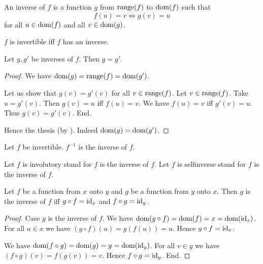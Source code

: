 \documentclass[../../set-theory.ftl.tex]{subfiles}
\begin{document}
  \begin{forthel}
    \begin{definition}
      An inverse of $f$ is a function $g$ from $\operatorname{range}(f)$ to $\operatorname{dom}(f)$ such that \[ f(u) = v \iff g(v) = u \] for all $u \in \operatorname{dom}(f)$ and all $v \in \operatorname{dom}(g)$.
    \end{definition}

    \begin{definition}
      $f$ is invertible iff $f$ has an inverse.
    \end{definition}

    \begin{lemma}
      Let $g,g'$ be inverses of $f$.
      Then $g = g'$.
    \end{lemma}
    \begin{proof}
      We have $\operatorname{dom}(g) = \operatorname{range}(f) = \operatorname{dom}(g')$.

      Let us show that $g(v) = g'(v)$ for all $v \in \operatorname{range}(f)$.
        Let $v \in \operatorname{range}(f)$.
        Take $u = g'(v)$.
        Then $g(v) = u$ iff $f(u) = v$.
        We have $f(u) = v$ iff $g'(v) = u$.
        Thus $g(v) = g'(v)$.
      End.

      Hence the thesis (by ).
      Indeed $\operatorname{dom}(g) = \operatorname{dom}(g')$.
    \end{proof}

    \begin{definition}
      Let $f$ be invertible.
      $f^{-1}$ is the inverse of $f$.
    \end{definition}

    Let $f$ is involutory stand for $f$ is the inverse of $f$.
    Let $f$ is selfinverse stand for $f$ is the inverse of $f$.

    \begin{proposition}\label{SetTheory_02_03_587168}
      Let $f$ be a function from $x$ onto $y$ and $g$ be a function from $y$ onto $x$.
      Then $g$ is the inverse of $f$ iff $g \circ f = \operatorname{id}_{x}$ and $f \circ g = \operatorname{id}_{y}$.
    \end{proposition}
    \begin{proof}
      Case $g$ is the inverse of $f$.
        We have $\operatorname{dom}(g \circ f) = \operatorname{dom}(f) = x = \operatorname{dom}(\operatorname{id}_{x})$.
        For all $u \in x$ we have $(g \circ f)(u) = g(f(u)) = u$.
        Hence $g \circ f = \operatorname{id}_{x}$.

        We have $\operatorname{dom}(f \circ g) = \operatorname{dom}(g) = y = \operatorname{dom}(\operatorname{id}_{y})$.
        For all $v \in y$ we have $(f \circ g)(v) = f(g(v)) = v$.
        Hence $f \circ g = \operatorname{id}_{y}$.
      End.


\end{proof}
\end{forthel}
\end{document}
